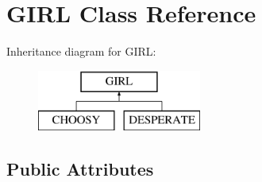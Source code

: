 \hypertarget{classGIRL}{}\section{G\+I\+RL Class Reference}
\label{classGIRL}
Inheritance diagram for G\+I\+RL\+:\begin{figure}[H]
\begin{center}
\leavevmode
\includegraphics[height=2.000000cm]{classGIRL}
\end{center}
\end{figure}
\subsection*{Public Attributes}
